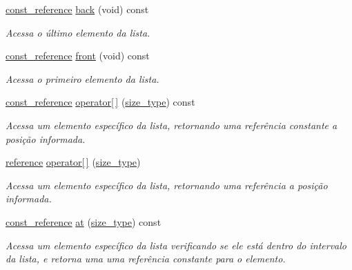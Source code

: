 \begin{DoxyCompactItemize}
\item 
\hyperlink{classsc_1_1vector_a8da2b1a11b069241100f9b2e14f481a0}{const\+\_\+reference} \hyperlink{classsc_1_1vector_a3b924e6f20777a29ef818a1805c7b357}{back} (void) const
\begin{DoxyCompactList}\small\item\em Acessa o último elemento da lista. \end{DoxyCompactList}\item 
\hyperlink{classsc_1_1vector_a8da2b1a11b069241100f9b2e14f481a0}{const\+\_\+reference} \hyperlink{classsc_1_1vector_aedc64f83fbbef7412eebbc609c0499d7}{front} (void) const
\begin{DoxyCompactList}\small\item\em Acessa o primeiro elemento da lista. \end{DoxyCompactList}\item 
\hyperlink{classsc_1_1vector_a8da2b1a11b069241100f9b2e14f481a0}{const\+\_\+reference} \hyperlink{classsc_1_1vector_af4883ec0fe8c11c4030200fde515eec7}{operator\mbox{[}$\,$\mbox{]}} (\hyperlink{classsc_1_1vector_a48bf37ba1a6d0c13504414d86e27c399}{size\+\_\+type}) const
\begin{DoxyCompactList}\small\item\em Acessa um elemento específico da lista, retornando uma referência constante a posição informada. \end{DoxyCompactList}\item 
\hyperlink{classsc_1_1vector_a37394c8a6b82c4a0709737d7982e32b2}{reference} \hyperlink{classsc_1_1vector_aab84734555f16bbb8a33f5e20257349d}{operator\mbox{[}$\,$\mbox{]}} (\hyperlink{classsc_1_1vector_a48bf37ba1a6d0c13504414d86e27c399}{size\+\_\+type})
\begin{DoxyCompactList}\small\item\em Acessa um elemento específico da lista, retornando uma referência a posição informada. \end{DoxyCompactList}\item 
\hyperlink{classsc_1_1vector_a8da2b1a11b069241100f9b2e14f481a0}{const\+\_\+reference} \hyperlink{classsc_1_1vector_aad1a99cfd4cbd7fe58bfb6439d78c8db}{at} (\hyperlink{classsc_1_1vector_a48bf37ba1a6d0c13504414d86e27c399}{size\+\_\+type}) const
\begin{DoxyCompactList}\small\item\em Acessa um elemento específico da lista verificando se ele está dentro do intervalo da lista, e retorna uma uma referência constante para o elemento. \end{DoxyCompactList}\item 

\end{DoxyCompactItemize}
